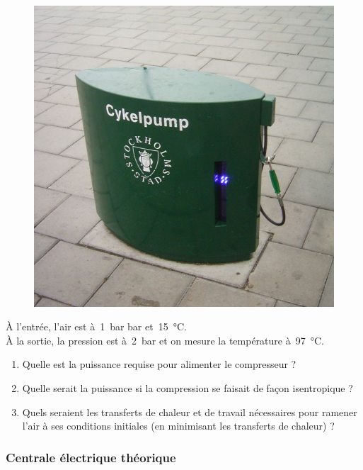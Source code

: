 	\begin{figure}[htp] %
		\begin{center}
			\includegraphics[width=0.6\columnwidth]{images/stockholm_pump.jpg}
		\end{center}
		\label{fig_pompe_stockholm}
	\end{figure}

	À l’entrée, l’air est à~\SI{1}{\bar} bar et~\SI{15}{\degreeCelsius}.\\
	À la sortie, la pression est à~\SI{2}{\bar} et on mesure la température à~\SI{97}{\degreeCelsius}.

	\begin{enumerate}
		\item Quelle est la puissance requise pour alimenter le compresseur ?
		\item Quelle serait la puissance si la compression se faisait de façon isentropique ?
		\item Quels seraient les transferts de chaleur et de travail nécessaires pour ramener l’air à ses conditions initiales (en minimisant les transferts de chaleur) ?
	\end{enumerate}

\subsubsection{Centrale électrique théorique}
\label{exo_cycle_carnot_vapeur}
	

